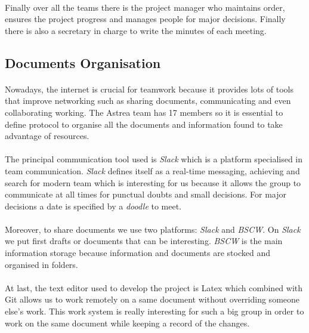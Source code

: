 \documentclass[12pt, titlepage]{scrartcl}
\begin{document}
\paragraph{}
Finally over all the teams there is the project manager who maintains order, ensures the project progress and manages people for major decisions. Finally there is also a secretary in charge to write the minutes of each meeting.


\subsection{Documents Organisation}
\paragraph{}
Nowadays, the internet is crucial for teamwork because it provides lots of tools that improve networking such as sharing documents, communicating and even collaborating working. The Astrea team has 17 members so it is essential to define protocol to organise all the documents and information found to take advantage of resources. 
\paragraph{}
The principal communication tool used is \textit{Slack} which is a platform specialised in team communication. \textit{Slack} defines itself as a real-time messaging, achieving and search for modern team which is interesting for us because it allows the group to communicate at all times for punctual doubts and small decisions. For major decisions a date is specified by a \textit{doodle} to meet.
\paragraph{}
Moreover, to share documents we use two platforms: \textit{Slack} and \textit{BSCW}. On \textit{Slack} we put first drafts or documents that can be interesting. \textit{BSCW} is the main information storage because information and documents are stocked and organised in folders.
\paragraph{}
At last, the text editor used to develop the project is Latex which combined with Git allows us to work remotely on a same document without overriding someone else's work. This work system is really interesting for such a big group in order to work on the same document while keeping a record of the changes. 
\end{document}
